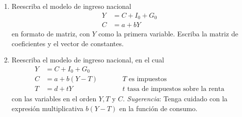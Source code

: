 \begin{ejercicio}
\begin{enumerate}
$$\begin{aligned}
        Q_s &= 4P-1
        \end{aligned}
        $$
        en formato de matriz?¿Por qué>
        \item Reescriba el modelo de ingreso nacional 
        $$
        \begin{aligned}
        Y &= C + I_0 + G_0 \\
        C &= a + bY
        \end{aligned}
        $$
        en formato de matriz, con \(Y\) como la primera variable. Escriba la matriz de coeficientes y el vector de constantes.
        \item Reescriba el modelo de ingreso nacional, en el cual 
        $$
        \begin{aligned}
            Y &= C+I_0+G_0 \\
            C &=a+b(Y-T) \qquad &&T\text{ es impuestos} \\
            T &= d+tY \qquad &&t\text{ tasa de impuestos sobre la renta}
        \end{aligned}
        $$
        con las variables en el orden \(Y, T\) y \(C\). \textit{Sugerencia}: Tenga cuidado con la expresión multiplicativa \(b(Y-T)\) en la función de consumo.
    \end{enumerate}
\end{ejercicio}